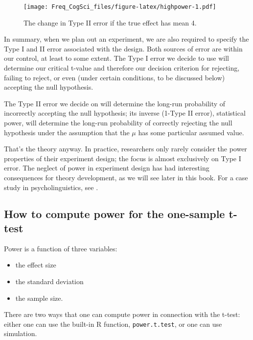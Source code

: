 \documentclass[12pt,]{krantz}
\providecommand{\tightlist}{%
  \setlength{\itemsep}{0pt}\setlength{\parskip}{0pt}}
\begin{document}
\begin{figure}
\centering
\texttt{[image: Freq\_CogSci\_files/figure-latex/highpower-1.pdf]}
\caption{\label{fig:highpower}The change in Type II error if the true effect has mean 4.}
\end{figure}

In summary, when we plan out an experiment, we are also required to specify the Type I and II error associated with the design. Both sources of error are within our control, at least to some extent. The Type I error we decide to use will determine our critical t-value and therefore our decision criterion for rejecting, failing to reject, or even (under certain conditions, to be discussed below) accepting the null hypothesis.

The Type II error we decide on will determine the long-run probability of incorrectly accepting the null hypothesis; its inverse (1-Type II error), statistical power, will determine the long-run probability of correctly rejecting the null hypothesis under the assumption that the \(\mu\) has some particular assumed value.

That's the theory anyway. In practice, researchers only rarely consider the power properties of their experiment design; the focus is almost exclusively on Type I error. The neglect of power in experiment design has had interesting consequences for theory development, as we will see later in this book. For a case study in psycholinguistics, see \citet{VasishthMertzenJaegerGelman2018}.

\hypertarget{how-to-compute-power-for-the-one-sample-t-test}{%
\subsection{How to compute power for the one-sample t-test}\label{how-to-compute-power-for-the-one-sample-t-test}}

Power is a function of three variables:

\begin{itemize}
\tightlist
\item
  the effect size
\item
  the standard deviation
\item
  the sample size.
\end{itemize}

There are two ways that one can compute power in connection with the t-test: either one can use the built-in R function, \texttt{power.t.test}, or one can use simulation.
\end{document}
